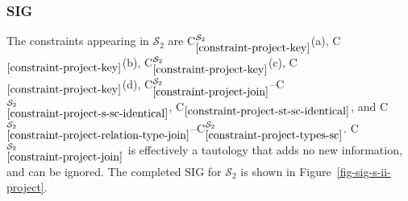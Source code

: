\documentclass{article}
\newcounter{constraint}
\newcommand{\schema}[1]{\ensuremath{\mathcal{S}_{#1}}}
\newcommand{\Constraint}[2][]{C\ensuremath{_{#2}\ifx&#1&\else^{#1}\fi}}
\begin{document}


\subsubsection{SIG}
\label{sec-sigs-s-ii-project}

\noindent The constraints appearing in \(\schema{2}\) are \Constraint[\schema{2}]{\ref{constraint-project-key}}(a), \Constraint{\ref{constraint-project-key}}(b), \Constraint[\schema{2}]{\ref{constraint-project-key}}(c), \Constraint{\ref{constraint-project-key}}(d), \Constraint[\schema{2}]{\ref{constraint-project-join}}--\Constraint[\schema{2}]{\ref{constraint-project-s-sc-identical}}, \Constraint{\ref{constraint-project-st-sc-identical}}, and \Constraint[\schema{2}]{\ref{constraint-project-relation-type-join}}--\Constraint[\schema{2}]{\ref{constraint-project-types-sc}}. \Constraint[\schema{2}]{\ref{constraint-project-join}} is effectively a tautology that adds no new information, and can be ignored. The completed SIG for \(\schema{2}\) is shown in Figure~\ref{fig-sig-s-ii-project}.

\end{document}
